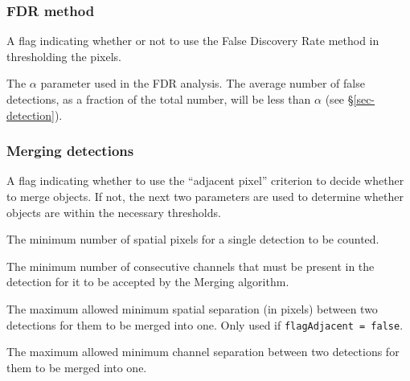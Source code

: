 \documentclass[12pt,a4paper]{article}
\newcommand{\entrylabel}[1]{\mbox{\textsf{\bf{#1:}}}\hfil}
\newenvironment{entry}
        {\begin{list}{}%
                {\renewcommand{\makelabel}{\entrylabel}%
                        \setlength{\labelwidth}{30mm}%
                        \setlength{\labelsep}{5pt}%
                        \setlength{\itemsep}{2pt}%
                        \setlength{\parsep}{2pt}%
                        \setlength{\leftmargin}{35mm}%
                }%
        }%
{\end{list}}
\begin{document}
\subsubsection*{FDR method}
\begin{entry}
\item[flagFDR {\tt [false]}] A flag indicating whether or not to use
  the False Discovery Rate method in thresholding the pixels.
\item[alphaFDR {\tt [0.01]}] The $\alpha$ parameter used in the FDR
analysis. The average number of false detections, as a fraction of the
total number, will be less than $\alpha$ (see \S\ref{sec-detection}).
\end{entry}

\subsubsection*{Merging detections}
\begin{entry}
\item[flagAdjacent {\tt [true]}] A flag indicating whether to use the
  ``adjacent pixel'' criterion to decide whether to merge objects. If
  not, the next two parameters are used to determine whether objects
  are within the necessary thresholds.
\item[minPix {\tt [2]}] The minimum number of spatial pixels for a single
  detection to be counted.
\item[minChannels {\tt [3]}] The minimum number of consecutive
  channels that must be present in the detection for it to be accepted
  by the Merging algorithm.
\item[threshSpatial {\tt [3.]}] The maximum allowed minimum spatial
  separation (in pixels) between two detections for them to be merged
  into one. Only used if {\tt flagAdjacent = false}.
\item[threshVelocity {\tt [7.]}] The maximum allowed minimum channel
  separation between two detections for them to be merged into
  one. %
\end{entry}
\end{document}
